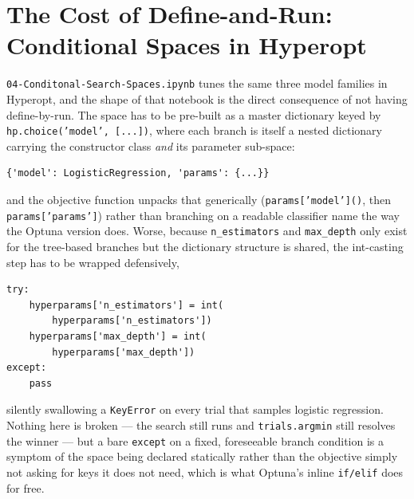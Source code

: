 \documentclass[conference]{IEEEtran}
\begin{document}
\section*{The Cost of Define-and-Run: Conditional Spaces in Hyperopt}
\texttt{04-Conditonal-Search-Spaces.ipynb} tunes the same three model families in Hyperopt, and the shape of that notebook is the direct consequence of not having define-by-run. The space has to be pre-built as a master dictionary keyed by \texttt{hp.choice('model', [...])}, where each branch is itself a nested dictionary carrying the constructor class \emph{and} its parameter sub-space:
\begin{verbatim}
{'model': LogisticRegression, 'params': {...}}
\end{verbatim}
and the objective function unpacks that generically (\texttt{params['model']()}, then \texttt{params['params']}) rather than branching on a readable classifier name the way the Optuna version does. Worse, because \texttt{n\_estimators} and \texttt{max\_depth} only exist for the tree-based branches but the dictionary structure is shared, the int-casting step has to be wrapped defensively,
\begin{verbatim}
try:
    hyperparams['n_estimators'] = int(
        hyperparams['n_estimators'])
    hyperparams['max_depth'] = int(
        hyperparams['max_depth'])
except:
    pass
\end{verbatim}
silently swallowing a \texttt{KeyError} on every trial that samples logistic regression. Nothing here is broken --- the search still runs and \texttt{trials.argmin} still resolves the winner --- but a bare \texttt{except} on a fixed, foreseeable branch condition is a symptom of the space being declared statically rather than the objective simply not asking for keys it does not need, which is what Optuna's inline \texttt{if/elif} does for free.
\end{document}
